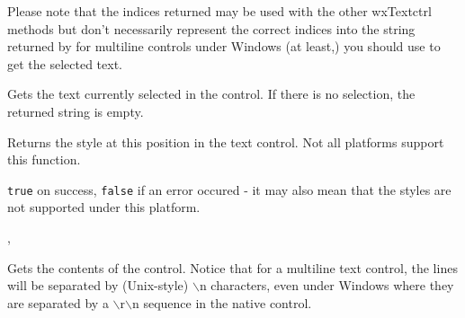 Please note that the indices returned may be used with the other wxTextctrl
methods but don't necessarily represent the correct indices into the string
returned by  for multiline controls
under Windows (at least,) you should use
 to get the selected
text.







\label{wxtextctrlgetstringselection}


Gets the text currently selected in the control. If there is no selection, the
returned string is empty.


\label{wxtextctrlgetstyle}


Returns the style at this position in the text control. Not all platforms
support this function.


{\tt true} on success, {\tt false} if an error occured - it may also mean that
the styles are not supported under this platform.


, 


\label{wxtextctrlgetvalue}


Gets the contents of the control. Notice that for a multiline text control,
the lines will be separated by (Unix-style) $\backslash$n characters, even
under Windows where they are separated by a $\backslash$r$\backslash$n
sequence in the native control.


\label{wxtextctrlhittest}

